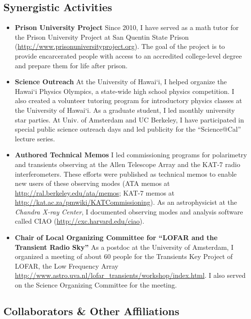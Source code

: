 \documentclass[11pt]{article}
\begin{document}
\subsection*{Synergistic Activities}

\begin{itemize}
 \item {\bf Prison University Project} Since 2010, I have served as a math tutor for the Prison University Project at San Quentin State Prison (\url{http://www.prisonuniversityproject.org}). The goal of the project is to provide encarcerated people with access to an accredited college-level degree and prepare them for life after prison.

 \item {\bf Science Outreach} At the University of Hawai`i, I helped organize the Hawai`i Physics Olympics, a state-wide high school physics competition. I also created a volunteer tutoring program for introductory physics classes at the University of Hawai`i. As a graduate student, I led monthly university star parties. At Univ. of Amsterdam and UC Berkeley, I have participated in special public science outreach days and led publicity for the ``Science@Cal'' lecture series.

 \item {\bf Authored Technical Memos} I led commissioning programs for polarimetry and transients observing at the Allen Telescope Array and the KAT-7 radio interferometers. These efforts were published as technical memos to enable new users of these observing modes (ATA memos at \url{http://ral.berkeley.edu/ata/memos}; KAT-7 memos at \url{http://kat.ac.za/pmwiki/KATCommissioning}). As an astrophysicist at the \emph{Chandra X-ray Center}, I documented observing modes and analysis software called CIAO (\url{http://cxc.harvard.edu/ciao}).

 \item {\bf Chair of Local Organizing Committee for ``LOFAR and the Transient Radio Sky''} As a postdoc at the University of Amsterdam, I organized a meeting of about 60 people for the Transients Key Project of LOFAR, the Low Frequency Array \url{http://www.astro.uva.nl/lofar_transients/workshop/index.html}. I also served on the Science Organizing Committee for the meeting.
\end{itemize}

\subsection*{Collaborators \& Other Affiliations}
\indent
\end{document}
